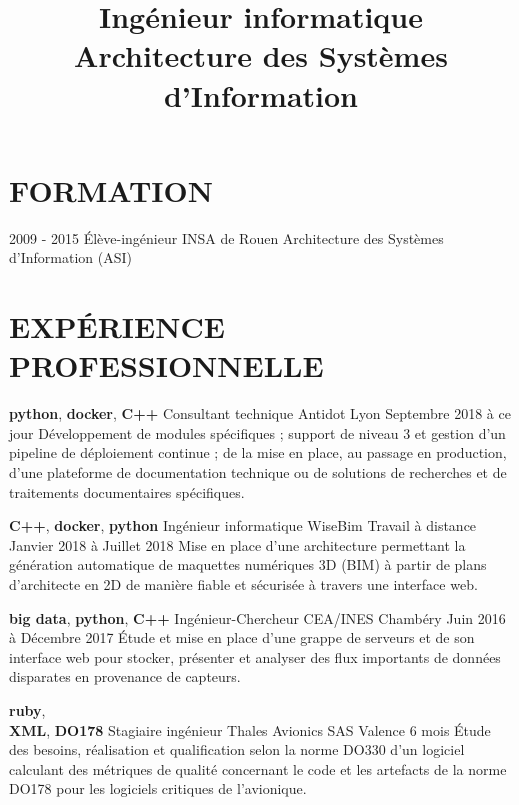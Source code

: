 \documentclass[11pt,a4paper]{moderncv}
\title{
  Ingénieur informatique \newline{}
  Architecture des Systèmes d'Information
}
\begin{document}
  \maketitle
  \vspace*{-5mm}
    \section{FORMATION}
    \cventry
    {2009 - 2015}
    {Élève-ingénieur}
    {INSA de Rouen}
    {Architecture des Systèmes d'Information (ASI)}
    {}{}



  \section{EXPÉRIENCE PROFESSIONNELLE}
  \cventry
    {\textbf{python}, \textbf{docker}, \textbf{C++}}
    {Consultant technique}
    {Antidot}
    {Lyon}
    {Septembre 2018 à ce jour}{
      Développement de modules spécifiques ; support de niveau 3 et gestion d'un pipeline de déploiement
      continue ; de la mise en place, au passage en production, d'une plateforme de documentation
      technique ou de solutions de recherches et de traitements documentaires spécifiques.
    }

  \cventry
    {\textbf{C++}, \textbf{docker}, \textbf{python}}
    {Ingénieur informatique}
    {WiseBim}
    {Travail à distance}
    {Janvier 2018 à Juillet 2018}{
      Mise en place d'une architecture permettant la génération automatique de
      maquettes numériques 3D (BIM) à partir de plans d'architecte en 2D de
      manière fiable et sécurisée à travers une interface web.
    }

  \cventry
    {\textbf{big data}, \textbf{python}, \textbf{C++}}
    {Ingénieur-Chercheur}
    {CEA/INES}
    {Chambéry}
    {Juin 2016 à Décembre 2017}{
      Étude et mise en place d'une grappe de serveurs et de son interface web
      pour stocker, présenter et analyser des flux importants de données
      disparates en provenance de capteurs.
    }

  \cventry
    {\textbf{ruby}, \\ \textbf{XML}, \textbf{DO178}}
    {Stagiaire ingénieur}
    {Thales Avionics SAS}
    {Valence}
    {6 mois}{
      Étude des besoins, réalisation et qualification selon la norme DO330
      d'un logiciel calculant des métriques de qualité concernant le code et
      les artefacts de la norme DO178 pour les logiciels critiques de
      l'avionique.
    }
\end{document}
